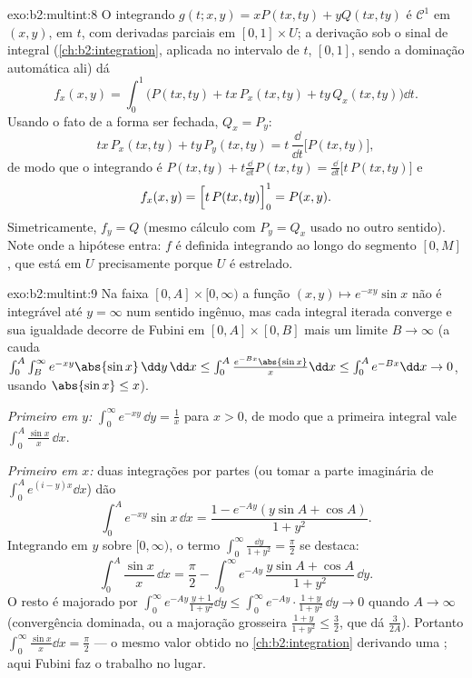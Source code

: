 \begin{solution}{exo:b2:multint:8}
O integrando $g(t; x, y) = xP(tx, ty) + yQ(tx, ty)$ é
$\mathcal{C}^1$ em $(x, y)$,  em $t$, com derivadas
parciais  em $[0,1] \times U$; a derivação sob
o sinal de integral (\cref{ch:b2:integration}, aplicada no
intervalo  de $t$, $[0,1]$, sendo a dominação automática ali)
dá
\[
f_x(x, y)
= \int_0^1 \bigl(P(tx, ty) + tx\,P_x(tx, ty)
+ ty\,Q_x(tx, ty)\bigr)\dd t .
\]
Usando o fato de a forma ser fechada, $Q_x = P_y$:
\[
tx\,P_x(tx, ty) + ty\,P_y(tx, ty)
= t\,\frac{\dd}{\dd t}\bigl[P(tx, ty)\bigr] ,
\]
de modo que o integrando é $P(tx, ty) + t\frac{\dd}{\dd t}P(tx, ty) =
\frac{\dd}{\dd t}\bigl[t\,P(tx, ty)\bigr]$ e
\[
f_x(x, y) = \Bigl[t\,P(tx, ty)\Bigr]_0^1 = P(x, y) .
\]
Simetricamente, $f_y = Q$ (mesmo cálculo com $P_y = Q_x$ usado
no outro sentido). Note onde a hipótese entra: $f$ é definida
integrando ao longo do segmento $[0, M]$, que está em $U$
precisamente porque $U$ é estrelado.
\end{solution}

\begin{solution}{exo:b2:multint:9}
Na faixa $[0, A] \times [0, \infty)$ a função $(x, y)
\mapsto e^{-xy}\sin x$ não é  integrável até $y =
\infty$  num sentido ingênuo, mas cada integral iterada
converge e sua igualdade decorre de Fubini em $[0, A]
\times [0, B]$ mais um limite $B \to \infty$ (a cauda
$\int_0^A\int_B^\infty e^{-xy}\abs{\sin x}\,\dd y\,\dd x \leq
\int_0^A \frac{e^{-Bx}\abs{\sin x}}{x}\dd x \leq \int_0^A e^{-Bx}
\dd x\to 0$, usando $\abs{\sin x} \leq x$).

\emph{Primeiro em $y$:} $\int_0^\infty e^{-xy}\,\dd y = \frac1x$ para $x
> 0$, de modo que a primeira integral vale $\int_0^A \frac{\sin x}{x}\,\dd x$.

\emph{Primeiro em $x$:} duas integrações por partes (ou tomar a
parte imaginária de $\int_0^A e^{(i - y)x}\dd x$) dão
\[
\int_0^A e^{-xy}\sin x\,\dd x
= \frac{1 - e^{-Ay}(y\sin A + \cos A)}{1 + y^2} .
\]
Integrando em $y$ sobre $[0, \infty)$, o termo $\int_0^\infty
\frac{\dd y}{1 + y^2} = \frac\pi2$ se destaca:
\[
\int_0^A \frac{\sin x}{x}\,\dd x
= \frac{\pi}{2}
- \int_0^\infty e^{-Ay}\,\frac{y\sin A + \cos A}{1 + y^2}\,\dd y .
\]
O resto é majorado por $\int_0^\infty e^{-Ay}\frac{y +
1}{1 + y^2}\dd y \leq \int_0^\infty e^{-Ay}\cdot\frac{1+y}{1+y^2}
\,\dd y \to 0$ quando $A \to \infty$ (convergência dominada, ou a
majoração grosseira $\frac{1 + y}{1 + y^2} \leq \frac32$, que dá
$\frac{3}{2A}$). Portanto $\int_0^\infty\frac{\sin x}{x}\dd x =
\frac\pi2$ --- o mesmo valor obtido no
\cref{ch:b2:integration} derivando uma ;
aqui Fubini faz o trabalho no lugar.
\end{solution}

